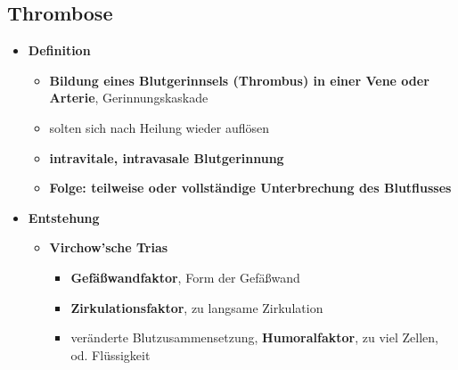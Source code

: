 	\subsection*{Thrombose}
		\begin{itemize}
			\item \textbf{Definition}
				\begin{itemize}
					\item \textbf{Bildung eines Blutgerinnsels (Thrombus) in einer Vene oder Arterie}, Gerinnungskaskade
					\item solten sich nach Heilung wieder auflösen
					\item \textbf{intravitale, intravasale Blutgerinnung}
					\item \textbf{Folge: teilweise oder vollständige Unterbrechung des Blutflusses}
				\end{itemize}
			\item \textbf{Entstehung}
					\begin{itemize}
						\item \textbf{Virchow'sche Trias}
							\begin{itemize}
								\item \textbf{Gefäßwandfaktor}, Form der Gefäßwand
								\item \textbf{Zirkulationsfaktor}, zu langsame Zirkulation
								\item veränderte Blutzusammensetzung, \textbf{Humoralfaktor}, zu viel Zellen, od. Flüssigkeit
							\end{itemize}
					\end{itemize}
		\end{itemize}
